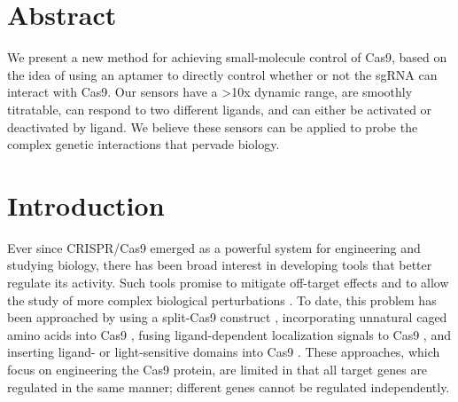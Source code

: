 \documentclass[10pt,oneside]{article}
\begin{document}
\section{Abstract}



We present a new method for achieving small-molecule control of Cas9, based on the idea of using an aptamer to directly control whether or not the sgRNA can interact with Cas9.  Our sensors have a >10x dynamic range, are smoothly titratable, can respond to two different ligands, and can either be activated or deactivated by ligand.  We believe these sensors can be applied to probe the complex genetic interactions that pervade biology.

\section{Introduction}


Ever since CRISPR/Cas9 emerged as a powerful system for engineering and studying biology, there has been broad interest in developing tools that better regulate its activity.  Such tools promise to mitigate off-target effects and to allow the study of more complex biological perturbations \autocite{richter2017}.  To date, this problem has been approached by using a split-Cas9 construct \autocite{zetsche2015,nguyen2016,nihongaki2015}, incorporating unnatural caged amino acids into Cas9 \autocite{hemphill2015,luo2016}, fusing ligand-dependent localization signals to Cas9 \autocite{liuramli2016}, and inserting ligand- or light-sensitive domains into Cas9 \autocite{oakes2016,richter2016}.  These approaches, which focus on engineering the Cas9 protein, are limited in that all target genes are regulated in the same manner; different genes cannot be regulated independently.


% 
% 
% 
%
\end{document}
